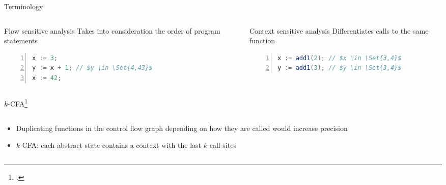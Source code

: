 \begin{frame}{Terminology}
  \begin{columns}[t]
  \begin{column}{.45\textwidth}
  \begin{block}{Flow sensitive analysis}
    Takes into consideration the order of program statements
  \end{block}
\begin{example}
\begin{lstlisting}[language=Java,numbers=left,columns=flexible,basewidth=0.45em,mathescape]
x := 3;
y := x + 1; // $y \in \Set{4,43}$
x := 42;
  \end{lstlisting}
  \end{example}
  \end{column}
  \begin{column}{.45\textwidth}
    \pause
  \begin{block}{Context sensitive analysis}
    Differentiates calls to the same function
  \end{block}
  \begin{example}
    \begin{lstlisting}[language=Java,numbers=left,columns=flexible,basewidth=0.45em,mathescape]
x := add1(2); // $x \in \Set{3,4}$
y := add1(3); // $y \in \Set{3,4}$
\end{lstlisting}
  \end{example}
\end{column}
\end{columns}
\end{frame}
        
\begin{frame}{$k$-CFA\footcite{shivers1991control}}
  \begin{columns}
  \begin{column}{0.5\textwidth}
  \begin{itemize}
  \item<2-> Duplicating functions in the control flow graph depending on
    how they are called would increase precision
  \item<3-> $k$-CFA: each abstract state contains a context with the last
    $k$ call sites
  \end{itemize}
  \end{column}

  \begin{column}{0.5\textwidth}
  \end{column}
  \end{columns}
\end{frame}

